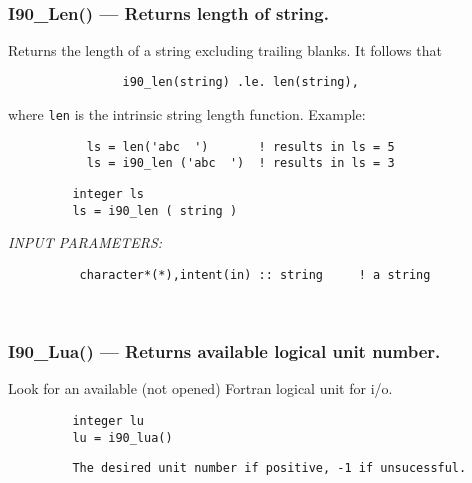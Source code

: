  
\mbox{}\hrulefill\ 
 
  \subsubsection{I90\_Len() --- Returns length of string. }

    Returns the length of a string excluding trailing blanks.
    It follows that 
    \begin{verbatim}
                i90_len(string) .le. len(string),
    \end{verbatim}
    where {\tt len} is the intrinsic string length function.  
    Example:
    \begin{verbatim}
           ls = len('abc  ')       ! results in ls = 5
           ls = i90_len ('abc  ')  ! results in ls = 3
    \end{verbatim}
  
\begin{verbatim}         integer ls
         ls = i90_len ( string )\end{verbatim}
{\em INPUT PARAMETERS:}
\begin{verbatim}
          character*(*),intent(in) :: string     ! a string
\end{verbatim}
 
 
\mbox{}\hrulefill\ 
 
  \subsubsection{I90\_Lua() --- Returns available logical unit number. }

    Look for an available (not opened) Fortran logical unit for i/o.
  
\begin{verbatim}         integer lu
         lu = i90_lua()\end{verbatim}
\begin{verbatim}
         The desired unit number if positive, -1 if unsucessful.
\end{verbatim}%
 
